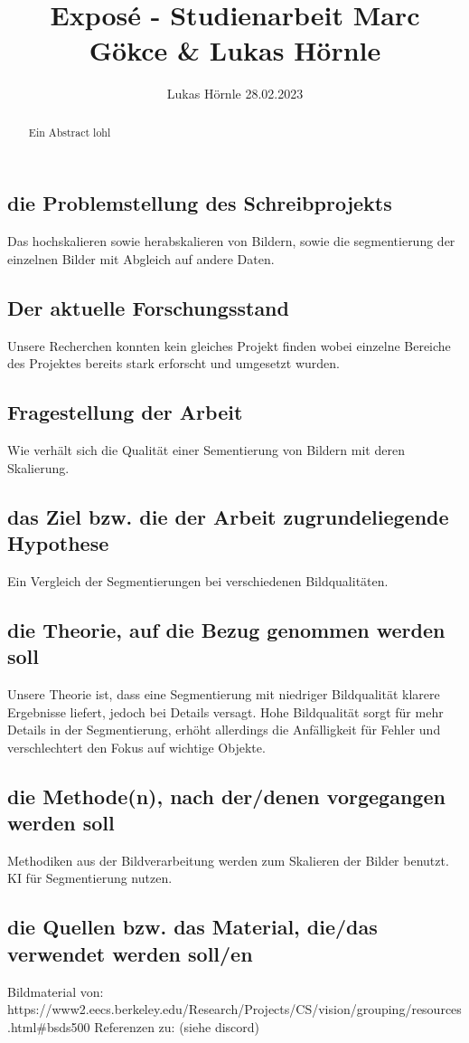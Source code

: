 \documentclass{article}
\title{Exposé - Studienarbeit Marc Gökce & Lukas Hörnle}
\author{Lukas Hörnle 28.02.2023}
\begin{document}
 \maketitle

 \begin{abstract}
  Ein Abstract lohl
 \end{abstract}

 \subsection{die Problemstellung des Schreibprojekts}
 Das hochskalieren sowie herabskalieren von Bildern, sowie die segmentierung der einzelnen Bilder mit Abgleich auf andere Daten.
 \subsection{Der aktuelle Forschungsstand}
 Unsere Recherchen konnten kein gleiches Projekt finden wobei einzelne Bereiche des Projektes bereits stark erforscht und umgesetzt wurden.
 \subsection{Fragestellung der Arbeit}
 Wie verhält sich die Qualität einer Sementierung von Bildern mit deren Skalierung.
 \subsection{das Ziel bzw. die der Arbeit zugrundeliegende Hypothese}
 Ein Vergleich der Segmentierungen bei verschiedenen Bildqualitäten.
 \subsection{die Theorie, auf die Bezug genommen werden soll}
 Unsere Theorie ist, dass eine Segmentierung mit niedriger Bildqualität klarere Ergebnisse liefert, jedoch bei Details versagt. Hohe Bildqualität sorgt für mehr Details in der Segmentierung, erhöht allerdings die Anfälligkeit für Fehler und verschlechtert den Fokus auf wichtige Objekte.
 \subsection{die Methode(n), nach der/denen vorgegangen werden soll}
 Methodiken aus der Bildverarbeitung werden zum Skalieren der Bilder benutzt.
 KI für Segmentierung nutzen.
 \subsection{die Quellen bzw. das Material, die/das verwendet werden soll/en}
 Bildmaterial von: \newline
 https://www2.eecs.berkeley.edu/Research/Projects/CS/vision/grouping/resources.html#bsds500
 Referenzen zu: (siehe discord)
\end{document}
